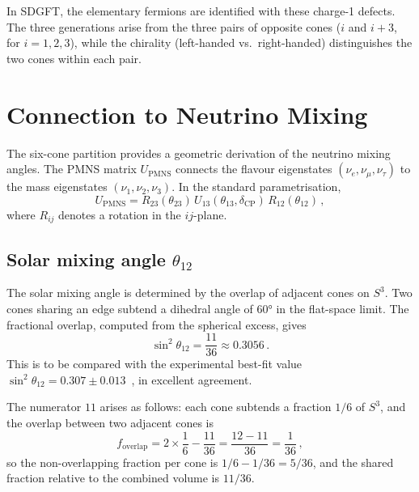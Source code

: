 \documentclass[amsmath,amssymb,aps,prd,twocolumn,superscriptaddress,nofootinbib]{revtex4-2}
\begin{document}
In SDGFT, the elementary fermions are identified with these charge-1 defects.
The three generations arise from the three pairs of opposite cones
($i$ and $i+3$, for $i = 1,2,3$), while the chirality
(left-handed vs.\ right-handed) distinguishes the two cones within each pair.

\section{Connection to Neutrino Mixing}\label{sec:neutrino}

The six-cone partition provides a geometric derivation of the neutrino mixing
angles.  The PMNS matrix $U_{\text{PMNS}}$ connects the flavour eigenstates
$(\nu_e,\nu_\mu,\nu_\tau)$ to the mass eigenstates $(\nu_1,\nu_2,\nu_3)$.
In the standard parametrisation,
\begin{equation}\label{eq:PMNS}
  U_{\text{PMNS}} = R_{23}(\theta_{23})\,
  U_{13}(\theta_{13},\delta_{\text{CP}})\,R_{12}(\theta_{12})\,,
\end{equation}
where $R_{ij}$ denotes a rotation in the $ij$-plane.

\subsection{Solar mixing angle $\theta_{12}$}

The solar mixing angle is determined by the overlap of adjacent cones on $S^3$.
Two cones sharing an edge subtend a dihedral angle of $60°$ in the flat-space
limit.  The fractional overlap, computed from the spherical excess, gives
\begin{equation}\label{eq:sin12}
  \sin^2\theta_{12} = \frac{11}{36} \approx 0.3056\,.
\end{equation}
This is to be compared with the experimental best-fit value
$\sin^2\theta_{12} = 0.307 \pm 0.013$~\cite{Esteban2020}, in excellent
agreement.

The numerator $11$ arises as follows: each cone subtends a fraction $1/6$ of
$S^3$, and the overlap between two adjacent cones is
\begin{equation}
  f_{\text{overlap}} = 2 \times \frac{1}{6} - \frac{11}{36}
  = \frac{12 - 11}{36} = \frac{1}{36}\,,
\end{equation}
so the non-overlapping fraction per cone is $1/6 - 1/36 = 5/36$, and the
shared fraction relative to the combined volume is $11/36$.
\end{document}

